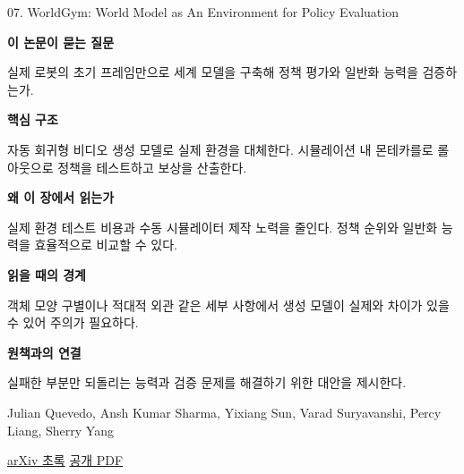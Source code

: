 \documentclass[11pt,openany]{book}
\begin{document}
\begin{termcard}{07. WorldGym: World Model as An Environment for Policy Evaluation}

\par

\medskip

{\sffamily\bfseries\color{deepblue} 이 논문이 묻는 질문}\par

실제 로봇의 초기 프레임만으로 세계 모델을 구축해 정책 평가와 일반화 능력을 검증하는가.

\smallskip

{\sffamily\bfseries\color{deepblue} 핵심 구조}\par

자동 회귀형 비디오 생성 모델로 실제 환경을 대체한다. 시뮬레이션 내 몬테카를로 롤아웃으로 정책을 테스트하고 보상을 산출한다.

\smallskip

{\sffamily\bfseries\color{deepblue} 왜 이 장에서 읽는가}\par

실제 환경 테스트 비용과 수동 시뮬레이터 제작 노력을 줄인다. 정책 순위와 일반화 능력을 효율적으로 비교할 수 있다.

\smallskip

{\sffamily\bfseries\color{coral} 읽을 때의 경계}\par

객체 모양 구별이나 적대적 외관 같은 세부 사항에서 생성 모델이 실제와 차이가 있을 수 있어 주의가 필요하다.

\smallskip

{\sffamily\bfseries\color{teal} 원책과의 연결}\par

실패한 부분만 되돌리는 능력과 검증 문제를 해결하기 위한 대안을 제시한다.

\medskip

{\footnotesize\color{muted} Julian Quevedo, Ansh Kumar Sharma, Yixiang Sun, Varad Suryavanshi, Percy Liang, Sherry Yang\par

\href{https://arxiv.org/abs/2506.00613}{arXiv 초록} \quad \href{https://arxiv.org/pdf/2506.00613}{공개 PDF}\par}

\end{termcard}
\end{document}
